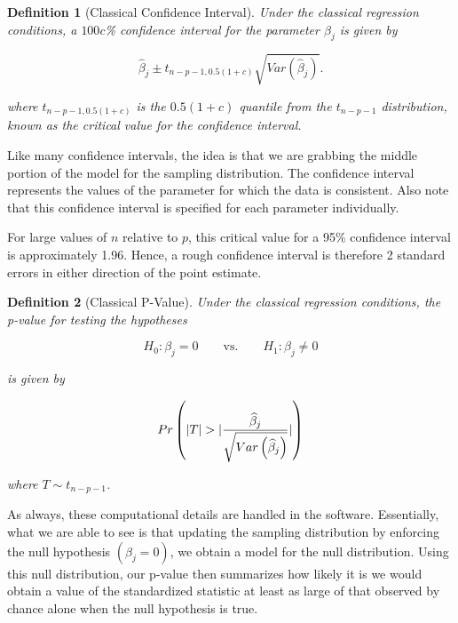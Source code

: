 \documentclass[
]{book}
\theoremstyle{plain}
\theoremstyle{mydefn}
\newtheorem{definition}{Definition}[chapter]
\theoremstyle{myexmpl}
\theoremstyle{remark}
\begin{document}
\begin{definition}[Classical Confidence Interval]
\protect\hypertarget{def:defn-classical-ci}{}{\label{def:defn-classical-ci} {} }Under the classical regression conditions, a \(100c\)\% confidence interval for the parameter \(\beta_j\) is given by

\[\widehat{\beta}_j \pm t_{n-p-1, 0.5(1+c)} \sqrt{Var\left(\widehat{\beta}_j\right)}.\]

where \(t_{n-p-1, 0.5(1+c)}\) is the \(0.5(1+c)\) quantile from the \(t_{n-p-1}\) distribution, known as the critical value for the confidence interval.\\
\end{definition}

Like many confidence intervals, the idea is that we are grabbing the middle portion of the model for the sampling distribution. The confidence interval represents the values of the parameter for which the data is consistent. Also note that this confidence interval is specified for each parameter individually.

For large values of \(n\) relative to \(p\), this critical value for a 95\% confidence interval is approximately 1.96. Hence, a rough confidence interval is therefore 2 standard errors in either direction of the point estimate.

\begin{definition}[Classical P-Value]
\protect\hypertarget{def:defn-classical-p}{}{\label{def:defn-classical-p} {} }Under the classical regression conditions, the p-value for testing the hypotheses

\[H_0: \beta_j = 0 \qquad \text{vs.} \qquad H_1: \beta_j \neq 0\]

is given by

\[Pr\left(\lvert T\rvert > \lvert\frac{\widehat{\beta}_j}{\sqrt{Var\left(\widehat{\beta}_j\right)}}\rvert\right)\]

where \(T \sim t_{n-p-1}\).
\end{definition}

As always, these computational details are handled in the software. Essentially, what we are able to see is that updating the sampling distribution by enforcing the null hypothesis \(\left(\beta_j = 0\right)\), we obtain a model for the null distribution. Using this null distribution, our p-value then summarizes how likely it is we would obtain a value of the standardized statistic at least as large of that observed by chance alone when the null hypothesis is true.
\end{document}
